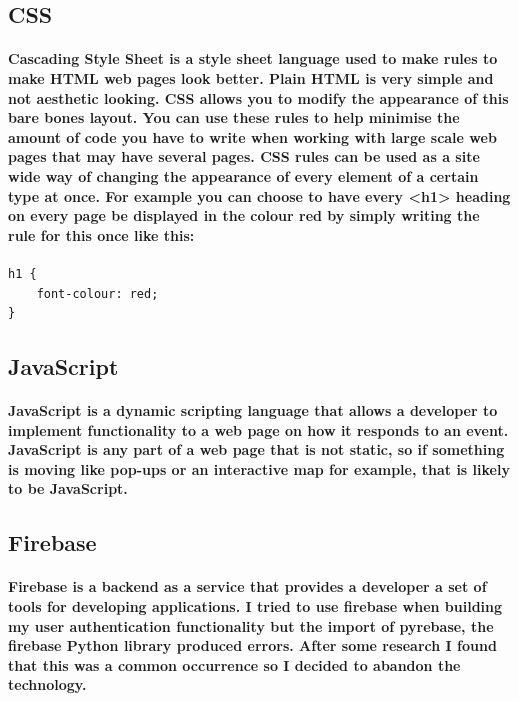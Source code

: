 \subsection{CSS}
\paragraph{Cascading Style Sheet is a style sheet language used to make rules to make HTML web pages look better. Plain HTML is very simple and not aesthetic looking. CSS allows you to modify the appearance of this bare bones layout. You can use these rules to help minimise the amount of code you have to write when working with large scale web pages that may have several pages. CSS rules can be used as a site wide way of changing the appearance of every element of a certain type at once. For example you can choose to have every <h1> heading on every page be displayed in the colour red by simply writing the rule for this once like this:}

\begin{verbatim}
h1 {
    font-colour: red;
}
\end{verbatim}

\subsection{JavaScript}
\paragraph{JavaScript is a dynamic scripting language that allows a developer to implement functionality to a web page on how it responds to an event. JavaScript is any part of a web page that is not static, so if something is moving like pop-ups or an interactive map for example, that is likely to be JavaScript.}

\subsection{Firebase}
\paragraph{Firebase is a backend as a service that provides a developer a set of tools for developing applications. I tried to use firebase when building my user authentication functionality but the import of pyrebase, the firebase Python library produced errors. After some research I found that this was a common occurrence so I decided to abandon the technology.}
















